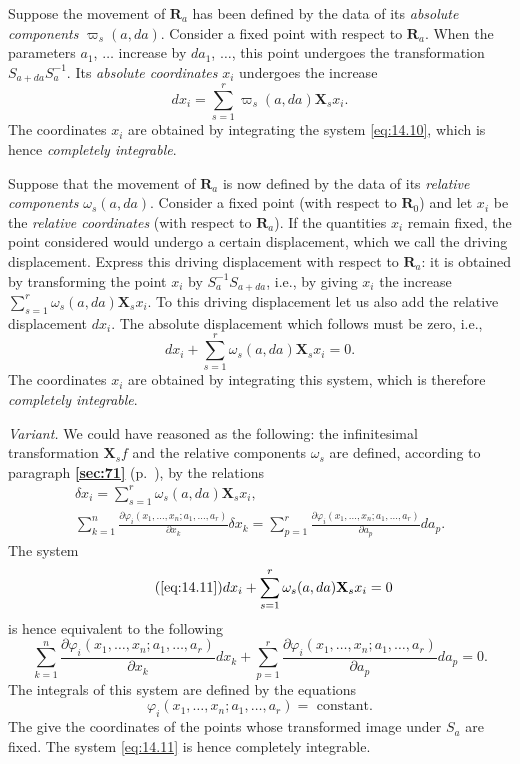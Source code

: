 \documentclass[leqno,11pt]{book}
\makeatletter
\numberwithin{equation}{chapter}
\newcommand{\pd}{\partial}
\theoremstyle{shape1}
\theoremstyle{shapesmall}
\let\old@phi\phi
\let\old@varphi\varphi
\let\phi\old@varphi
\let\varphi\old@phi
\newcommand{\fsref}[1]{{\rm\textsection\textbf{\ref{sec:#1}}}}
\newcommand{\vp}{\varpi}
\newcommand{\somespace}{\vspace{9pt}}
\makeatother
\begin{document}
Suppose the movement of $\mathbf{R}_{a}$ has been defined by the data of its \emph{absolute components} $\vp_{s}(a,da)$. Consider a fixed point with respect to $\mathbf{R}_{a}$. When the parameters $a_{1}$, $\dots$ increase by $da_{1}$, $\dots$, this point undergoes the transformation $S_{a+da}S_{a}^{-1}$. Its \emph{absolute coordinates} $x_{i}$ undergoes the increase
\begin{equation}
  \label{eq:14.10}
  dx_{i}=\sum_{s=1}^{r}\vp_{s}(a,da)\mathbf{X}_{s}x_{i}.
\end{equation}
The coordinates $x_{i}$ are obtained by integrating the system \eqref{eq:14.10}, which is hence \emph{completely integrable}.

Suppose that the movement of $\mathbf{R}_{a}$ is now defined by the data of its \emph{relative components} $\omega_{s}(a,da)$. Consider a fixed point (with respect to $\mathbf{R}_{0}$) and let $x_{i}$ be the \emph{relative coordinates} (with respect to $\mathbf{R}_{a}$). If the quantities $x_{i}$ remain fixed, the point considered would undergo a certain displacement, which we call the driving displacement. Express this driving displacement with respect to $\mathbf{R}_{a}$: it is obtained by transforming the point $x_{i}$ by $S_{a}^{-1}S_{a+da}$, i.e., by giving $x_{i}$ the increase $\sum_{s=1}^{r}\omega_{s}(a,da)\mathbf{X}_{s}x_{i}$. To this driving displacement let us also add the relative displacement $dx_{i}$. The absolute displacement which follows must be zero, i.e.,
\begin{equation}
  \label{eq:14.11}
  dx_{i}+\sum_{s=1}^{r}\omega_{s}(a,da)\mathbf{X}_{s}x_{i}=0.
\end{equation}
The coordinates $x_{i}$ are obtained by integrating this system, which is therefore \emph{completely integrable}.

\somespace

\emph{Variant.} We could have reasoned as the following: the infinitesimal transformation $\mathbf{X}_{s}f$ and the relative components $\omega_{s}$ are defined, according to paragraph \fsref{71} (p.~\pageref{sec:71}), by the relations
\begin{gather*}
  \delta x_{i}=\sum_{s=1}^{r}\omega_{s}(a,da)\mathbf{X}_{s}x_{i},\\
  \sum_{k=1}^{n}\frac{\pd\phi_{i}(x_{1},\dots,x_{n};a_{1},\dots,a_{r})}{\pd x_{k}}\delta x_{k}=\sum_{p=1}^{r}\frac{\pd \phi_{i}(x_{1},\dots,x_{n};a_{1},\dots,a_{r})}{\pd a_{p}}da_{p}.
\end{gather*}
The system
\begin{equation}
  \tag{\ref{eq:14.11}}
  dx_{i}+\sum_{s=1}^{r}\omega_{s}(a,da)\mathbf{X}_{s}x_{i}=0
\end{equation}
is hence equivalent to the following
\[
\sum_{k=1}^{n}\frac{\pd\phi_{i}(x_{1},\dots,x_{n};a_{1},\dots,a_{r})}{\pd x_{k}}d x_{k}+\sum_{p=1}^{r}\frac{\pd \phi_{i}(x_{1},\dots,x_{n};a_{1},\dots,a_{r})}{\pd a_{p}}da_{p}=0.
\]
The integrals of this system are defined by the equations
\[
\phi_{i}(x_{1},\dots,x_{n};a_{1},\dots,a_{r})=\text{ constant.}
\]
The give the coordinates of the points whose transformed image under $S_{a}$ are fixed. The system \eqref{eq:14.11} is hence completely integrable.
\end{document}

